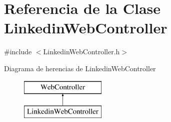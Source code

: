\hypertarget{classLinkedinWebController}{}\section{Referencia de la Clase Linkedin\+Web\+Controller}
\label{classLinkedinWebController}


{\ttfamily \#include $<$Linkedin\+Web\+Controller.\+h$>$}

Diagrama de herencias de Linkedin\+Web\+Controller\begin{figure}[H]
\begin{center}
\leavevmode
\includegraphics[height=2.000000cm]{classLinkedinWebController}
\end{center}
\end{figure}
